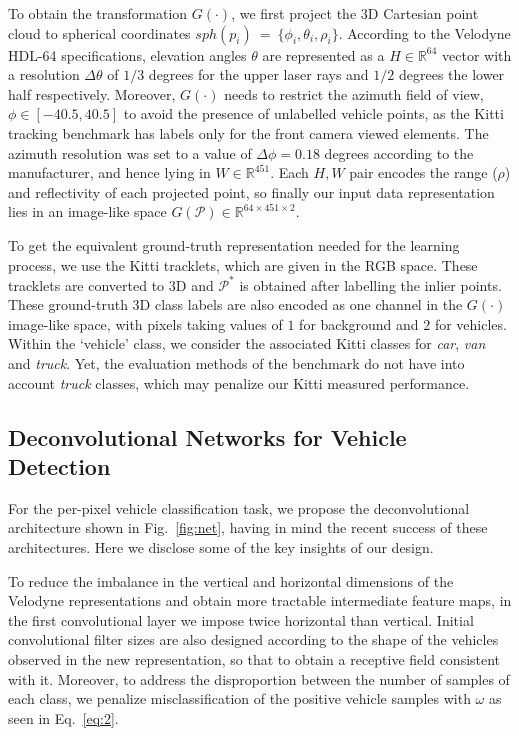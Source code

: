 \documentclass[letterpaper, 10 pt, conference]{ieeeconf}  %
\begin{document}
To obtain the transformation $G(\cdot)$, we first project the 3D Cartesian point cloud to spherical coordinates $sph(p_i)~=~\{\phi_i,\theta_i, \rho_i\}$. According to the Velodyne HDL-64 specifications, elevation angles $\theta$ are represented as a $H \in \mathbb{R}^{64}$ vector with a resolution $\Delta\theta$ of $1/3$ degrees for the upper laser rays and $1/2$ degrees the lower half respectively. Moreover, $G(\cdot)$ needs to restrict the azimuth field of view, $\phi \in [-40.5,40.5]$ to avoid the presence of unlabelled vehicle points, as the Kitti tracking benchmark has labels only for the front camera viewed elements. The azimuth resolution was set to a value of  $\Delta\phi=0.18$ degrees according to the manufacturer, and hence lying in $W \in \mathbb{R}^{451}$. 
Each $H,W$ pair encodes the range ($\rho$) and reflectivity of each projected point, so finally our input data representation lies in an image-like space $G(\mathcal{P}) \in \mathbb{R}^{64 \times 451 \times 2}$. 

To get the equivalent ground-truth representation needed for the learning process, we use the Kitti tracklets, which are given in the RGB space. These tracklets are converted to 3D and $\mathcal{P^*}$ is obtained after labelling the inlier points. These ground-truth 3D class labels are also encoded as one channel in the $G(\cdot)$ image-like space, with pixels taking values of $1$ for background and $2$ for vehicles. Within the `vehicle' class, we consider the associated Kitti classes for \textit{car}, \textit{van} and \textit{truck}. Yet,  the evaluation methods of the benchmark do not have into account \textit{truck} classes, which may penalize our Kitti measured performance. 

\subsection{Deconvolutional Networks for Vehicle Detection}\label{sec:net}%
For the per-pixel vehicle classification task, we propose the deconvolutional architecture shown in Fig.~\ref{fig:net}, having in mind the recent success of these architectures. Here we disclose some of the key insights of our design. 

To reduce the imbalance in the vertical and horizontal dimensions of the Velodyne representations and obtain more tractable intermediate feature maps, in the first convolutional layer we impose twice horizontal than vertical. %
Initial convolutional filter sizes are also designed according to the shape of the vehicles observed in the new representation, so that to obtain a receptive field consistent with it.
Moreover, to address the disproportion between the number of samples of each class, we penalize misclassification of the positive vehicle samples with $\omega$ as seen in Eq.~\ref{eq:2}.
\end{document}
